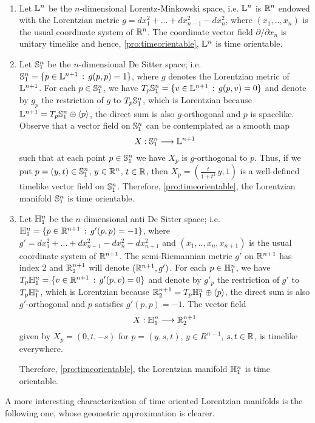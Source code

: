 \begin{example}
	~		
	\begin{enumerate}
		\item Let $\L^n$ be the $n$-dimensional Lorentz-Minkowski space, i.e. $\L^n$ is $\R^n$ endowed with the Lorentzian metric $g=dx_1^2+...+dx_{n-1}^2-dx_n^2$, where $(x_1,..,x_n)$ is the usual coordinate system of $\R^n$. The coordinate vector field $\partial/\partial x_n$ is unitary timelike and hence, \autoref{pro:timeorientable}, $\L ^n$ is time orientable.
		\item Let $\S_1^n$ be the $n$-dimensional De Sitter space; i.e. $\S_1^n =\{p \in \L^{n+1} \, :\, g(p,p)=1 \}$, where $g$ denotes the Lorentzian metric of $\L^{n+1}$. For each $p \in \S_1^n$, we have $T_p\S_1^n=\{v \in \L^{n+1} \, : \, g(p,v)=0\}$
		and denote by $g_p$ the restriction of $g$ to $T_p\S_1^n$, which is Lorentzian because $\L^{n+1}=T_p\S_1^n \oplus \langle p \rangle$, the direct sum is also $g$-orthogonal and $p$ is spacelike. Observe that a vector field on $\S_1^n$ can be contemplated as a smooth map
		\[
		X : \S_1^n \longrightarrow \L^{n+1}
		\]
		such that at each point $p \in \S_1^n$ we have $X_p$ is $g$-orthogonal to $p$. Thus, if we put $p=(y,t)\in \S_1^n$, $y \in \R^n$, $t \in \R$, then $X_p=(\frac{t}{1+t^2}\,y,1)$ is a well-defined timelike vector field on $\S_1^n$. Therefore, \autoref{pro:timeorientable}, the Lorentzian manifold $\S_1^n$ is time orientable.
		\item Let $\H_1^n$ be the $n$-dimensional anti De Sitter space; i.e. $\H_1^n =\{p \in \R^{n+1} \, :\, g'(p,p)=-1 \}$, where $g'=dx_1^2+...+dx_{n-1}^2-dx_n^2-dx_{n+1}^2$ and $(x_1,..,x_n,x_{n+1})$ is the usual coordinate system of $\R^{n+1}$. The semi-Riemannian metric $g'$ on $\R^{n+1}$ has index 2 and $\R^{n+1}_2$ will denote $(\R^{n+1},g')$. For each $p \in \H_1^n$, we have $T_p\H_1^n=\{v \in \R^{n+1} \, : \, g'(p,v)=0\}$ and denote by $g'_p$ the restriction of $g'$ to $T_p\H_1^n$, which is Lorentzian because $\R^{n+1}_2=T_p\H_1^n \oplus \langle p \rangle$, the direct sum is also $g'$-orthogonal and $p$ satisfies $g'(p,p)=-1$. The vector field
		\[
		X : \H_1^n \longrightarrow \R^{n+1}_2
		\]
		given by $X_p=(0,t,-s)$ for $p=(y,s,t)$, $y \in R^{n-1}$, $s,t\in \R$, is timelike everywhere.
		
		Therefore, \autoref{pro:timeorientable}, the Lorentzian manifold $\H_1^n$ is time orientable.
	\end{enumerate}
\end{example}

A more interesting characterization of time oriented Lorentzian manifolds is the following one, whose geometric approximation is clearer.

